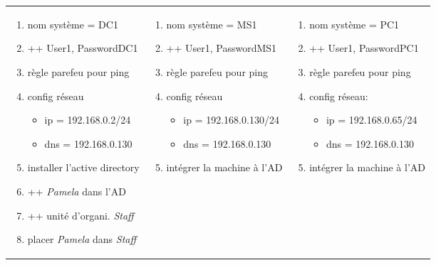 \documentclass[a4paper]{article}
\begin{document}
\begin{center}
\begin{tabular}{|p{5cm}|p{5cm}|p{5cm}|}
        \begin{enumerate}
            \item nom système = DC1
            \item ++ User1, PasswordDC1
            \item règle parefeu pour ping
            \item config réseau
            \begin{itemize}
                \item ip = 192.168.0.2/24
                \item dns = 192.168.0.130
            \end{itemize}
            \item installer l'active directory
            \item ++ \textit{Pamela} dans l’AD
            \item ++ unité d’organi. \textit{Staff}
            \item placer \textit{Pamela} dans \textit{Staff}
        \end{enumerate}
        &
        \begin{enumerate}
            \item nom système = MS1
            \item ++ User1, PasswordMS1
            \item règle parefeu pour ping
            \item config réseau
            \begin{itemize}
                \item ip = 192.168.0.130/24
                \item dns = 192.168.0.130
            \end{itemize}
            \item intégrer la machine à l’AD
        \end{enumerate}
        &
        \begin{enumerate}
            \item nom système = PC1
            \item ++ User1, PasswordPC1
            \item règle parefeu pour ping
            \item config réseau:
            \begin{itemize}
                \item ip = 192.168.0.65/24
                \item dns = 192.168.0.130
            \end{itemize}
            \item intégrer la machine à l’AD
        \end{enumerate}


\end{tabular}
\end{center}
\end{document}
